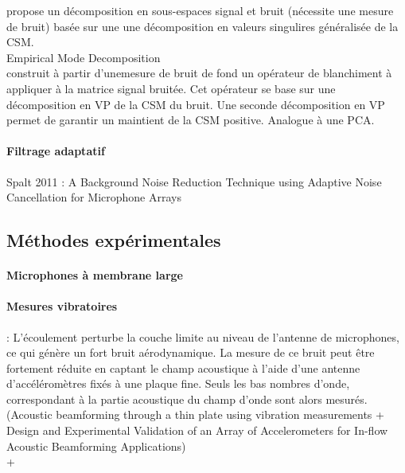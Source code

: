 \cite{Bulte2007} propose un décomposition en sous-espaces signal et bruit (nécessite une mesure de bruit) basée sur une une décomposition en valeurs singulires généralisée de la CSM.\\
Empirical Mode Decomposition\\

\cite{Bahr2015} construit à partir d'unemesure de bruit de fond un opérateur de blanchiment à appliquer à la matrice signal bruitée. Cet opérateur se base sur une décomposition en VP de la CSM du bruit. Une seconde décomposition en VP permet de garantir un maintient de la CSM positive. Analogue à une PCA.

\paragraph{\tbullet Filtrage adaptatif}
Spalt 2011 : A Background Noise Reduction Technique using Adaptive Noise Cancellation for Microphone Arrays\\










\subsection{Méthodes expérimentales}

\paragraph{\tbullet Microphones à membrane large}

\paragraph{\tbullet Mesures vibratoires} \cite{Lecoq2013} : L'écoulement perturbe la couche limite au niveau de l'antenne de microphones, ce qui génère un fort bruit aérodynamique. La mesure de ce bruit peut être fortement réduite en captant le champ acoustique à l'aide d'une antenne d'accéléromètres fixés à une plaque fine. Seuls les bas nombres d'onde, correspondant à la partie acoustique du champ d'onde sont alors mesurés. (Acoustic beamforming through a thin plate using vibration measurements  +   Design and Experimental Validation of an Array of Accelerometers for In-flow Acoustic Beamforming Applications) \\
+ \cite{leclere:hal-01279944}

